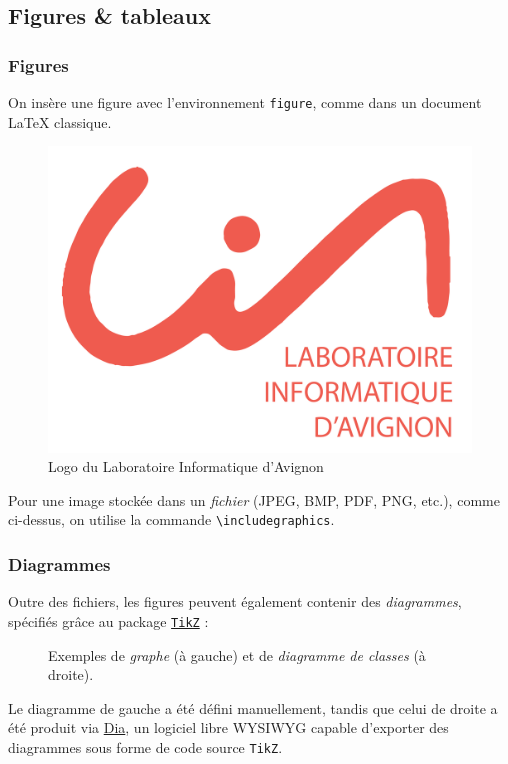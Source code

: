 \documentclass[10pt,    %
    french,             %
    xcolor=table,       %
    envcountsect        %
]{beamer}
\begin{document}
\subsection{Figures \& tableaux}
\begin{frame}
    \frametitle{Figures}
    
    On insère une figure avec l'environnement \texttt{figure}, comme dans un document \LaTeX{} classique.
    
    \begin{figure}[H]
        \centering
        \includegraphics[scale=0.05]{images/lia_logo.pdf}
        \vspace{-0.5cm}
        \caption{Logo du Laboratoire Informatique d'Avignon}
        \label{fig:LIAlogo}
    \end{figure}
    
    \vspace{0.25cm}
    Pour une image stockée dans un \textit{fichier} (JPEG, BMP, PDF, PNG, etc.), comme ci-dessus, on utilise la commande \texttt{\textbackslash{}includegraphics}.
\end{frame}

\begin{frame}
    \frametitle{Diagrammes}
    Outre des fichiers, les figures peuvent également contenir des \textit{diagrammes}, spécifiés grâce au package \href{https://ctan.org/pkg/pgf?lang=en}{\texttt{TikZ}} :

    \begin{figure}[H]
        \centering
        \resizebox{0.35\linewidth}{!}{}
        \hspace{0.25cm}\hspace{0.25cm}
        \resizebox{0.45\linewidth}{!}{}
        \caption{Exemples de \textit{graphe} (à gauche) et de \textit{diagramme de classes} (à droite).}
        \label{fig:diagrams}
    \end{figure}
    
    \vspace{-0.5cm}
    Le diagramme de gauche a été défini manuellement, tandis que celui de droite a été produit via \href{http://dia-installer.de}{Dia}, un logiciel libre WYSIWYG capable d'exporter des diagrammes sous forme de code source \texttt{TikZ}.
\end{frame}
    
\end{document}
